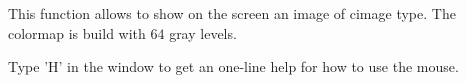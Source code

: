 This function allows to show on the screen an image of cimage type.
The colormap is build with $64$ gray levels.

Type 'H' in the window to get an one-line help for how to use the mouse.
